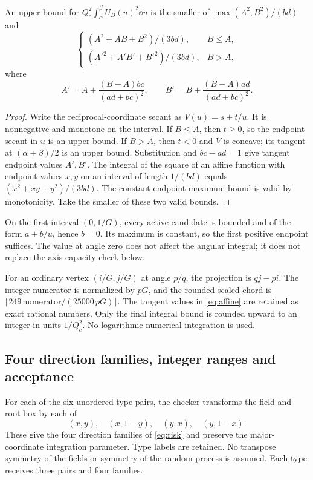 \begin{lemma}\label{lem:affine}
An upper bound for \(Q_c^2\int_\alpha^\beta U_B(u)^2\dd u\) is
the smaller of \(\max(A^2,B^2)/(bd)\) and
\begin{equation}\label{eq:affine}
 \begin{cases}
 (A^2+AB+B^2)/(3bd),&B\le A,\\[2pt]
 (A'^2+A'B'+B'^2)/(3bd),&B>A,
 \end{cases}
\end{equation}
where
\[
 A'=A+\frac{(B-A)bc}{(ad+bc)^2},\qquad
 B'=B+\frac{(B-A)ad}{(ad+bc)^2}.
\]
\end{lemma}
\begin{proof}
Write the reciprocal-coordinate secant as \(V(u)=s+t/u\).
It is nonnegative and monotone on the interval. If \(B\le A\),
then \(t\ge0\), so the endpoint secant in \(u\) is an upper bound.
If \(B>A\), then \(t<0\) and \(V\) is concave; its tangent at
\((\alpha+\beta)/2\) is an upper bound. Substitution and
\(bc-ad=1\) give tangent endpoint values \(A',B'\).
The integral of the square of an affine function with endpoint
values \(x,y\) on an interval of length \(1/(bd)\) equals
\((x^2+xy+y^2)/(3bd)\). The constant endpoint-maximum bound is
valid by monotonicity. Take the smaller of these two valid bounds.
\end{proof}

On the first interval \((0,1/G)\), every active candidate is bounded
and of the form \(a+b/u\), hence \(b=0\). Its maximum is constant,
so the first positive endpoint suffices. The value at angle zero
does not affect the angular integral; it does not replace the axis
capacity check below.

For an ordinary vertex \((i/G,j/G)\) at angle \(p/q\), the
projection is \(qj-pi\). The integer numerator is normalized by
\(pG\), and the rounded scaled chord is
\(\lceil249\,\text{numerator}/(25000\,pG)\rceil\).
The tangent values in \eqref{eq:affine} are retained as exact rational
numbers. Only the final integral bound is rounded upward to an integer
in units \(1/Q_c^2\). No logarithmic numerical integration is used.

\subsection{Four direction families, integer ranges and acceptance}
For each of the six unordered type pairs, the checker transforms the
field and root box by each of
\[
 (x,y),\quad(x,1-y),\quad(y,x),\quad(y,1-x).
\]
These give the four direction families of \eqref{eq:risk} and preserve
the major-coordinate integration parameter. Type labels are retained.
No transpose symmetry of the fields or symmetry of the random process
is assumed. Each type receives three pairs and four families.

